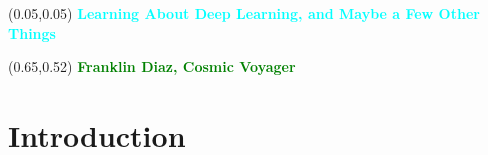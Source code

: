 \documentclass[aspectratio=169]{beamer} %
\begin{document}
\begin{frame}
    \setlength{\TPHorizModule}{\textwidth}
    \setlength{\TPVertModule}{\textwidth}
    \begin{textblock}{0.6}(0.05,0.05)
      \bfseries\Huge\textcolor{cyan}{Learning About Deep Learning, and Maybe a Few Other Things}
    \end{textblock}
    \begin{textblock}{0.5}(0.65,0.52)
        \bfseries\textcolor{green}{Franklin Diaz, Cosmic Voyager}
    \end{textblock}
\end{frame}

\section{Introduction}
\end{document}

